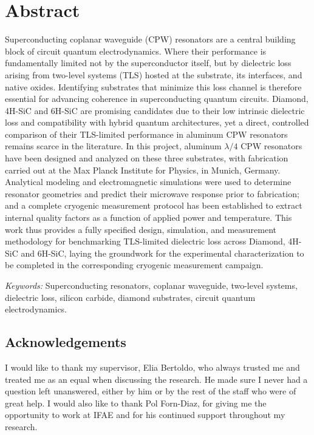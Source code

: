 \documentclass[12pt, a4paper]{article}
\begin{document}
\newpage

\section*{Abstract}

Superconducting coplanar waveguide (CPW) resonators are a central building block of circuit quantum electrodynamics. Where their performance is fundamentally limited not by the superconductor itself, but by dielectric loss arising from two-level systems (TLS) hosted at the substrate, its interfaces, and native oxides. Identifying substrates that minimize this loss channel is therefore essential for advancing coherence in superconducting quantum circuits. Diamond, 4H-SiC and 6H-SiC are promising candidates due to their low intrinsic dielectric loss and compatibility with hybrid quantum architectures, yet a direct, controlled comparison of their TLS-limited performance in aluminum CPW resonators remains scarce in the literature. In this project, aluminum $\lambda/4$ CPW resonators have been designed and analyzed on these three substrates, with fabrication carried out at the Max Planck Institute for Physics, in Munich, Germany. Analytical modeling and electromagnetic simulations were used to determine resonator geometries and predict their microwave response prior to fabrication; and a complete cryogenic measurement protocol has been established to extract internal quality factors as a function of applied power and temperature. This work thus provides a fully specified design, simulation, and measurement methodology for benchmarking TLS-limited dielectric loss across Diamond, 4H-SiC and 6H-SiC, laying the groundwork for the experimental characterization to be completed in the corresponding cryogenic measurement campaign.

\textit{Keywords:} Superconducting resonators, coplanar waveguide, two-level systems, dielectric loss, silicon carbide, diamond substrates, circuit quantum electrodynamics.

\newpage

\subsection*{Acknowledgements}

I would like to thank my supervisor, Elia Bertoldo, who always trusted me and treated me as an equal when discussing the research. He made sure I never had a question left unanswered, either by him or by the rest of the staff who were of great help. I would also like to thank Pol Forn-Diaz, for giving me the opportunity to work at IFAE and for his continued support throughout my research.
\end{document}
